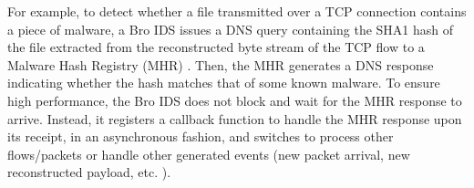 


For example, to detect whether a file transmitted over a TCP connection contains a piece of malware, a Bro IDS \cite{bro} issues a DNS query containing the SHA1 hash \cite{sha1} of the file extracted from the reconstructed byte stream of the TCP flow to a Malware Hash Registry (MHR) \cite{MHR}. Then, the MHR generates a DNS response indicating whether the hash matches that of some known malware. To ensure high performance, the Bro IDS does not block and wait for the MHR response to arrive. Instead, it registers a callback function to handle the MHR response upon its receipt, in an asynchronous fashion, and switches to process other flows/packets or handle other generated events (new packet arrival, new reconstructed payload, etc. \cite{paxson1999bro}).

